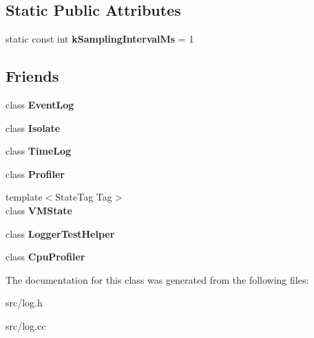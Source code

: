 \subsection*{Static Public Attributes}
\begin{DoxyCompactItemize}
\item 
\hypertarget{classv8_1_1internal_1_1_logger_ae03be0fed70cdda7c26ff02b8a1586b0}{}static const int {\bfseries k\+Sampling\+Interval\+Ms} = 1\label{classv8_1_1internal_1_1_logger_ae03be0fed70cdda7c26ff02b8a1586b0}

\end{DoxyCompactItemize}
\subsection*{Friends}
\begin{DoxyCompactItemize}
\item 
\hypertarget{classv8_1_1internal_1_1_logger_a640116136ce15d7180db4807ac2fbe77}{}class {\bfseries Event\+Log}\label{classv8_1_1internal_1_1_logger_a640116136ce15d7180db4807ac2fbe77}

\item 
\hypertarget{classv8_1_1internal_1_1_logger_aba4f0964bdacf2bbf62cf876e5d28d0a}{}class {\bfseries Isolate}\label{classv8_1_1internal_1_1_logger_aba4f0964bdacf2bbf62cf876e5d28d0a}

\item 
\hypertarget{classv8_1_1internal_1_1_logger_a1c4918f5f53a4fc9fcdaa6bca4bf5204}{}class {\bfseries Time\+Log}\label{classv8_1_1internal_1_1_logger_a1c4918f5f53a4fc9fcdaa6bca4bf5204}

\item 
\hypertarget{classv8_1_1internal_1_1_logger_ad73e5645d5b7b84a00d4a5d07b8d8078}{}class {\bfseries Profiler}\label{classv8_1_1internal_1_1_logger_ad73e5645d5b7b84a00d4a5d07b8d8078}

\item 
\hypertarget{classv8_1_1internal_1_1_logger_a625fbe66123c83b3cafa99a202c00225}{}{\footnotesize template$<$State\+Tag Tag$>$ }\\class {\bfseries V\+M\+State}\label{classv8_1_1internal_1_1_logger_a625fbe66123c83b3cafa99a202c00225}

\item 
\hypertarget{classv8_1_1internal_1_1_logger_a4702c0b6e47a7a03f8fee92352c3209f}{}class {\bfseries Logger\+Test\+Helper}\label{classv8_1_1internal_1_1_logger_a4702c0b6e47a7a03f8fee92352c3209f}

\item 
\hypertarget{classv8_1_1internal_1_1_logger_acb7d0754758c89612a316001c25d07c4}{}class {\bfseries Cpu\+Profiler}\label{classv8_1_1internal_1_1_logger_acb7d0754758c89612a316001c25d07c4}

\end{DoxyCompactItemize}


The documentation for this class was generated from the following files\+:\begin{DoxyCompactItemize}
\item 
src/log.\+h\item 
src/log.\+cc\end{DoxyCompactItemize}
